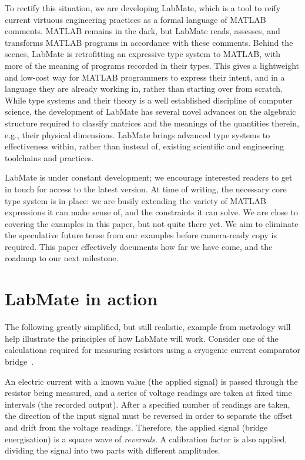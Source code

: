 \documentclass{IMEKO2024}
\begin{document}
To rectify this situation, we are developing LabMate, which is a tool
to reify current virtuous engineering practices as a formal language
of MATLAB comments. MATLAB remains in the dark, but LabMate reads,
assesses, and transforms MATLAB programs in accordance with these
comments.
%
Behind the scenes, LabMate is retrofitting an expressive type system
to MATLAB, with more of the meaning of programs recorded in their
types.
%
This gives a lightweight and low-cost way for MATLAB programmers to
express their intent, and in a language they are already working in,
rather than starting over from scratch.
%
While type systems and their theory is a well established discipline
of computer science, the development of LabMate has several novel
advances on the algebraic structure required to classify
matrices and the meanings of the quantities therein, e.g., their
physical dimensions. LabMate brings advanced type systems to
effectiveness within, rather than instead of, existing scientific and
engineering toolchains and practices.

 LabMate is under constant development; we encourage interested readers to get in touch for access to the latest version.
 At time of writing, the necessary core type system is in place: we are busily extending the variety of MATLAB expressions it can make sense of, and the constraints it can solve.
%
We are close to covering the examples in this paper, but not quite there yet.
%
We aim to eliminate the speculative future tense from our examples before camera-ready copy is required.
%
This paper effectively documents how far we have come, and the roadmap to our next milestone.

\section{LabMate in action}
\label{sec:example}


The following greatly simplified, but still realistic, example from metrology  will help illustrate the principles of how LabMate will work. Consider one of the calculations required for measuring resistors using a cryogenic current comparator bridge~\cite{Williams_2010}.

An electric current with a known value (the applied signal) is passed through the resistor being measured, and a series of voltage readings are taken at fixed time intervals (the recorded output). After a specified number of readings are taken, the direction of the input signal must be reversed in order to separate the offset and drift from the voltage readings. Therefore, the applied signal (bridge energisation) is a square wave of {\em reversals}. A calibration factor is also applied, dividing the signal into two parts with different amplitudes.
\end{document}
